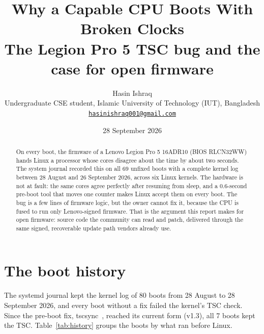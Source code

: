\documentclass[11pt,a4paper]{article}
\title{Why a Capable CPU Boots With Broken Clocks\\[4pt]
  \large The Legion Pro 5 TSC bug and the case for open firmware}
\author{Hasin Ishraq\\
  \small Undergraduate CSE student, Islamic University of Technology (IUT), Bangladesh\\
  \small \href{mailto:hasinishraq001@gmail.com}{\nolinkurl{hasinishraq001@gmail.com}}}
\date{28 September 2026}
\begin{document}
\maketitle

\begin{abstract}
\noindent
On every boot, the firmware of a Lenovo Legion Pro 5 16ADR10 (BIOS RLCN32WW)
hands Linux a processor whose cores disagree about the time by about two
seconds. The system journal recorded this on all 69 unfixed boots with a
complete kernel log between 28 August and 26 September 2026, across six
Linux kernels. The hardware is not at fault: the same cores agree perfectly
after resuming from sleep, and a 0.6-second pre-boot tool that moves one
counter makes Linux accept them on every boot. The bug is a few lines of
firmware logic, but the owner cannot fix it, because the CPU is fused to run
only Lenovo-signed firmware. That is the argument this report makes for open
firmware: source code the community can read and patch, delivered through the
same signed, recoverable update path vendors already use.
\end{abstract}

\section{The boot history}

The systemd journal kept the kernel log of 80 boots from 28 August to
28 September 2026, and every boot without a fix failed the kernel's TSC
check. Since the pre-boot fix, tscsync~\cite{tscsync}, reached its current
form (v1.3), all 7 boots kept the TSC. Table~\ref{tab:history} groups the
boots by what ran before Linux.
\end{document}
